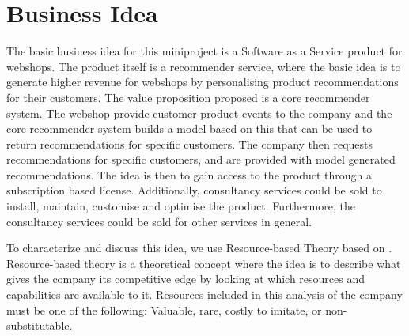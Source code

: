 \section{Business Idea}
The basic business idea for this miniproject is a Software as a Service product for webshops. 
The product itself is a recommender service, where the basic idea is to generate higher revenue for webshops by personalising product recommendations for their customers. 
The value proposition proposed is a core recommender system.
The webshop provide customer-product events to the company and the core recommender system builds a model based on this that can be used to return recommendations for specific customers.
The company then requests recommendations for specific customers, and are provided with model generated recommendations. 
The idea is then to gain access to the product through a subscription based license.
Additionally, consultancy services could be sold to install, maintain, customise and optimise the product. Furthermore, the consultancy services could be sold for other services in general.

To characterize and discuss this idea, we use Resource-based Theory based on \citet[pg. 13]{book:jrose}.
Resource-based theory is a theoretical concept where the idea is to describe what gives the company its competitive edge by looking at which resources and capabilities are available to it.
Resources included in this analysis of the company must be one of the following: Valuable, rare, costly to imitate, or non-substitutable.

